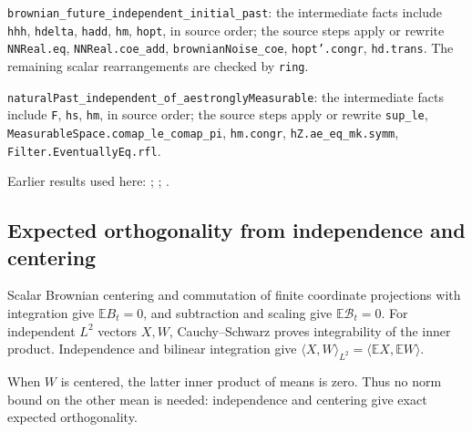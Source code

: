 \documentclass[11pt,a4paper]{report}
\begin{document}
\begin{leanbox}
\texttt{brownian\_\allowbreak{}future\_\allowbreak{}independent\_\allowbreak{}initial\_\allowbreak{}past}: the intermediate facts include \texttt{hhh}, \texttt{hdelta}, \texttt{hadd}, \texttt{hm}, \texttt{hopt}, in source order; the source steps apply or rewrite \texttt{NNReal.\allowbreak{}eq}, \texttt{NNReal.\allowbreak{}coe\_\allowbreak{}add}, \texttt{brownian\allowbreak{}Noise\_\allowbreak{}coe}, \texttt{hopt'.\allowbreak{}congr}, \texttt{hd.\allowbreak{}trans}. The remaining scalar rearrangements are checked by \texttt{ring}.



\texttt{natural\allowbreak{}Past\_\allowbreak{}independent\_\allowbreak{}of\_\allowbreak{}aestrongly\allowbreak{}Measurable}: the intermediate facts include \texttt{F}, \texttt{hs}, \texttt{hm}, in source order; the source steps apply or rewrite \texttt{sup\_\allowbreak{}le}, \texttt{Measurable\allowbreak{}Space.\allowbreak{}comap\_\allowbreak{}le\_\allowbreak{}comap\_\allowbreak{}pi}, \texttt{hm.\allowbreak{}congr}, \texttt{h\allowbreak{}Z.\allowbreak{}ae\_\allowbreak{}eq\_\allowbreak{}mk.\allowbreak{}symm}, \texttt{Filter.\allowbreak{}Eventually\allowbreak{}Eq.\allowbreak{}rfl}.
\end{leanbox}


Earlier results used here: \cite[Section~3.24.8]{LangevinLean2026ULASC}; \cite[Section~3.25.1]{LangevinLean2026ULASC}; \cite[Section~3.54.4]{LangevinLean2026ULASC}.
\subsection{\texorpdfstring{Expected orthogonality from independence and centering}{Expected orthogonality from independence and centering}}
\label{report-step-ProximalLangevin-SplittingOrthogonality-lean-4}


Scalar Brownian centering and commutation of finite coordinate projections with integration give \(\mathbb E B_t=0\), and subtraction and scaling give \(\mathbb E\mathcal B_t=0\). For independent \(L^2\) vectors \(X,W\), Cauchy–Schwarz proves integrability of the inner product. Independence and bilinear integration give \(\langle X,W\rangle_{L^2}=\langle\mathbb E X,\mathbb E W\rangle\).



When \(W\) is centered, the latter inner product of means is zero. Thus no norm bound on the other mean is needed: independence and centering give exact expected orthogonality.
\end{document}
